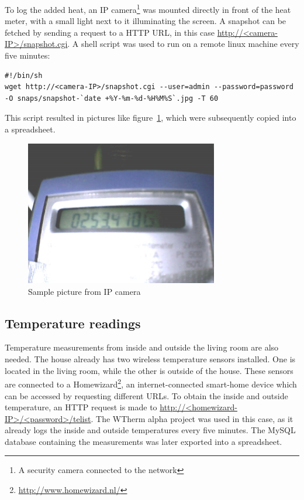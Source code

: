 \documentclass[12pt,a4paper,final]{report}
\begin{document}
To log the added heat, an IP camera\footnote{A security camera connected to the network} was mounted directly in front of the heat meter, with a small light next to it illuminating the screen. A snapshot can be fetched by sending a request to a HTTP URL, in this case \url{http://<camera-IP>/snapshot.cgi}. A shell script was used to run on a remote linux machine every five minutes:
\lstset{language=bash}
\begin{lstlisting}[caption={Downloading and renaming a snapshot}]
#!/bin/sh
wget http://<camera-IP>/snapshot.cgi --user=admin --password=password -O snaps/snapshot-`date +%Y-%m-%d-%H%M%S`.jpg -T 60
\end{lstlisting}
This script resulted in pictures like figure~\ref{fig:snap}, which were subsequently copied into a spreadsheet.
\begin{figure}[H] 
  \begin{center} 
      \includegraphics[width=0.75\textwidth]{snapshot-2014-12-13-060001}
  \end{center}
  \caption{Sample picture from IP camera}
  \label{fig:snap}
\end{figure} 

\subsection{Temperature readings} \label{sec:TempReadings}
Temperature measurements from inside and outside the living room are also needed. The house already has two wireless temperature sensors installed. One is located in the living room, while the other is outside of the house. These sensors are connected to a 
Homewizard\footnote{\url{http://www.homewizard.nl/}}, an internet-connected smart-home device which can be accessed by requesting different URLs. To obtain the inside and outside temperature, an HTTP request is made to \url{http://<homewizard-IP>/<password>/telist}\cite{HomeWizardAPI}. The WTherm alpha project was used in this case, as it already logs the inside and outside temperatures every five minutes. The MySQL database containing the measurements was later exported into a spreadsheet.
\end{document}

